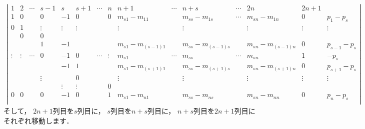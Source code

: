 \documentclass[a4paper]{jsarticle}
\begin{document}
\begin{align*}
\left|\begin{array}{c|c|c|c|c|c|c|c|c|c|c|c|c|c|c}
1      & 2      & \cdots & s-1    & s      & s+1    & \cdots & n      & n+1            & \cdots & n+s            & \cdots & 2n             & 2n+1   & \\
\hline
1      & 0      &        & 0      &-1      & 0      &        & 0      & m_{s1}-m_{11}    &        & m_{ss}-m_{1s}    & \cdots & m_{sn}-m_{1n}    & 0      & p_{1}-p_{s} \\
0      & 1      &        & \vdots & \vdots & \vdots &        &        & \vdots         &        & \vdots         &        & \vdots         & \vdots & \vdots \\
       & 0      &        & 0      &        &        &        &        &                &        &                &        &                &        &        \\
       &        &        & 1      &-1      &        &        &        & m_{s1}-m_{(s-1)1} &        & m_{ss}-m_{(s-1)s} &        & m_{sn}-m_{(s-1)n} & 0      & p_{s-1}-p_{s} \\
\vdots & \vdots & \cdots & 0      &-1      & 0      & \cdots & \vdots & m_{s1}          & \cdots & m_{ss}          & \cdots & m_{sn}          & 1      &-p_{s} \\
       &        &        &        &-1      & 1      &        &        & m_{s1}-m_{(s+1)1} &        & m_{ss}-m_{(s+1)s} &        & m_{sn}-m_{(s+1)n} & 0      & p_{s+1}-p_{s} \\
       &        &        & \vdots &        & 0      &        &        & \vdots         &        & \vdots         &        & \vdots         & \vdots & \vdots \\
       &        &        &        & \vdots & \vdots &        & 0      &                &        &                &        &                &        &        \\
0      & 0      &        & 0      &-1      & 0      &        & 1      & m_{s1}-m_{n1}    &        & m_{ss}-m_{ns}    &        & m_{sn}-m_{nn}    & 0      & p_{n}-p_{s} \\
\end{array}\right|
\end{align*}
そして，
$2n+1$列目を$s$列目に，
$s$列目を$n+s$列目に，
$n+s$列目を$2n+1$列目にそれぞれ移動します．
\end{document}
